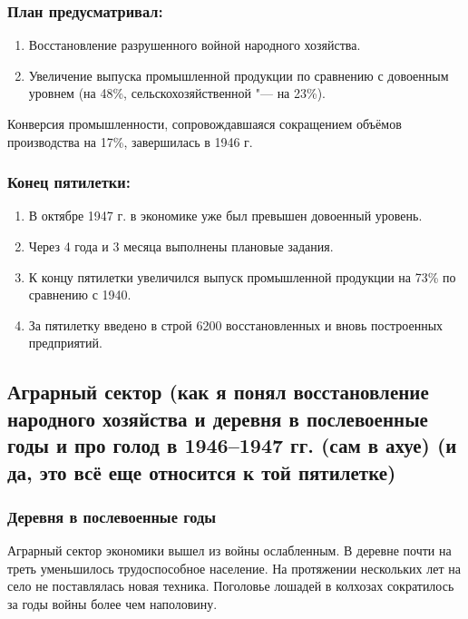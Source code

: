 \subsubsection{\textbf{План предусматривал:}}

\begin{enumerate}
    \item Восстановление разрушенного войной народного хозяйства.
    \item Увеличение выпуска промышленной продукции по сравнению с довоенным уровнем (на 48\%, сельскохозяйственной "--- на 23\%). 
\end{enumerate}

Конверсия промышленности, сопровождавшаяся сокращением объёмов производства на 17\%, завершилась в 1946 г.

\subsubsection{\textbf{Конец пятилетки:}}

\begin{enumerate}
    \item В октябре 1947 г. в экономике уже был превышен довоенный уровень.
    \item Через 4 года и 3 месяца выполнены плановые задания.
    \item К концу пятилетки увеличился выпуск промышленной продукции на 73\% по сравнению с 1940.
    \item За пятилетку введено в строй 6200 восстановленных и вновь построенных предприятий.
\end{enumerate}

\subsection{Аграрный сектор (как я понял восстановление народного хозяйства и деревня в послевоенные годы и про голод в 1946--1947 гг. (сам в ахуе) (и да, это всё еще относится к той пятилетке)}

\subsubsection{\textbf{Деревня в послевоенные годы}}

Аграрный сектор экономики вышел из войны ослабленным. В деревне почти на треть уменьшилось трудоспособное население. На протяжении нескольких лет на село не поставлялась новая техника. Поголовье лошадей в колхозах сократилось за годы войны более чем наполовину. 

